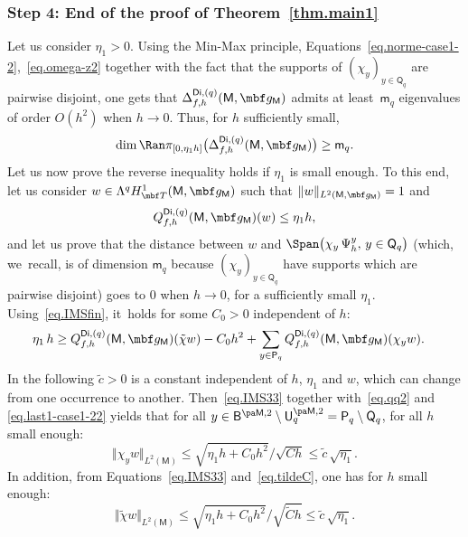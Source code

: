 \subsubsection*{Step 4: End of the proof of Theorem~\ref{thm.main1}}
Let us consider $\eta_1>0$.
Using the Min-Max principle,
Equations~\eqref{eq.norme-case1-2},~\eqref{eq.omega-z2} together with
the fact that the supports of $(\chi_y)_{y\in \mathsf Q_q}$ are
pairwise disjoint, one gets that $\Delta_{f,h}^{\mathsf{Di},(q)}(\mathsf M,\mbf g_{\mathsf M})$ admits at least~$\mathsf m_q$
eigenvalues of order $O(h^{2})$ when $h\to 0$. Thus, for $h$
sufficiently small,
\[
\dim \Ran \pi_{[0,\eta_1h]}\bigl(\Delta_{f,h}^{\mathsf{Di},(q)}(\mathsf M,\mbf g_{\mathsf M})\bigr)\ge \mathsf m_q.
\]
Let us now prove the reverse inequality holds if $\eta_1$ is small enough. To this end, let us consider $w\in \Lambda^qH^1_{\mbf T}(\mathsf M,\mbf g_{\mathsf M})$ such that $\Vert w\Vert_{L^2(\mathsf M,\mbf g_{\mathsf M})}=1$ and
\[
Q_{f,h}^{\mathsf{Di},(q)}(\mathsf M,\mbf g_{\mathsf M})(w)\le \eta_1 h,
\]
and let us prove that the distance between $w$ and $\Span \bigl(\chi_y\,\Psi_h^y, \, y\in \mathsf Q_q \bigr) $ (which, we~recall, is of dimension $\mathsf m_q$ because $(\chi_y)_{y\in \mathsf Q_q}$ have supports which are pairwise disjoint)
goes to $0$ when $h\to 0$, for a sufficiently small $\eta_1$.
Using~\eqref{eq.IMSfin}, it~holds for some $C_0>0$ independent of $h$:
\begin{align}\label{eq.IMS33}
\eta_1\, h &\ge Q_{f,h}^{\mathsf{Di},(q)}(\mathsf M,\mbf g_{\mathsf M})(\tilde \chi w) -C_0 h^2 +\sum_{y\in \mathsf P_q} Q_{f,h}^{\mathsf{Di},(q)}(\mathsf M,\mbf g_{\mathsf M})(\chi_y w).
\end{align}
In the following $\tilde c>0$ is a constant independent of $h$, $\eta_1$ and $w$, which can change from one occurrence to another.
Then~\eqref{eq.IMS33} together with~\eqref{eq.qq2} and
\eqref{eq.last1-case1-22} yields that for all $y\in \mathsf B^{\pa
\mathsf M,2} \setminus \mathsf U_q^{\pa \mathsf M,2}= \mathsf
P_q\setminus \mathsf Q_q$, for all $h$ small enough:
\begin{equation}\label{eq.est-norm1}
\Vert \chi_y w\Vert_{L^2(\mathsf M)}\le \sqrt {\eta_1h +C_0h^2 }/{\sqrt{C h }} \le \tilde c \, {\sqrt{\eta_1}}.
\end{equation}
In addition, from Equations~\eqref{eq.IMS33} and~\eqref{eq.tildeC}, one has for $h$ small enough:
\begin{equation}\label{eq.est-norm2}
\Vert\tilde \chi w \Vert_{L^2(\mathsf M)}\le \sqrt {\eta_1h +C_0h^2 }/{\sqrt{\tilde C h }}\le \tilde c \, {\sqrt{\eta_1}}.
\end{equation}
